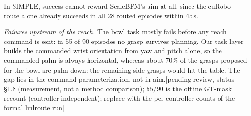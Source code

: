 \documentclass[conference]{IEEEtran}
\newif\ifdraft \drafttrue
\newcommand{\dnote}[1]{\ifdraft{\color{red}\footnotesize[#1]}\fi}
\begin{document}
In SIMPLE, success cannot reward ScaleBFM's aim at all, since the cuRobo route alone already succeeds in all 28 routed episodes within 45\,s.

\emph{Failures upstream of the reach.} The bowl task mostly fails before any reach command is sent: in 55 of 90 episodes no grasp survives planning. Our task layer builds the commanded wrist orientation from yaw and pitch alone, so the commanded palm is always horizontal, whereas about 70\% of the grasps proposed for the bowl are palm-down; the remaining side grasps would hit the table. The gap lies in the command parameterization, not in aim.\dnote{pending review, status §1.8 (measurement, not a method comparison); 55/90 is the offline GT-mask recount (controller-independent); replace with the per-controller counts of the formal lmlroute run}
\end{document}
